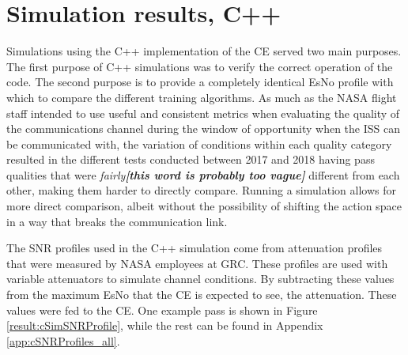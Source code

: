 \section{Simulation results, C++}
\par Simulations using the C++ implementation of the CE served two main purposes. The first purpose of C++ simulations was to verify the correct operation of the code. The second purpose is to provide a completely identical EsNo profile with which to compare the different training algorithms. As much as the NASA flight staff intended to use useful and consistent metrics when evaluating the quality of the communications channel during the window of opportunity when the ISS can be communicated with, the variation of conditions within each quality category resulted in the different tests conducted between 2017 and 2018 having pass qualities that were \textit{fairly\textbf{[this word is probably too vague]}} different from each other, making them harder to directly compare. Running a simulation allows for more direct comparison, albeit without the possibility of shifting the action space in a way that breaks the communication link.
\par The SNR profiles used in the C++ simulation come from attenuation profiles that were measured by NASA employees at GRC. These profiles are used with variable attenuators to simulate channel conditions. By subtracting these values from the maximum EsNo that the CE is expected to see, the attenuation. These values were fed to the CE. One example pass is shown in Figure \ref{result:cSimSNRProfile}, while the rest can be found in Appendix \ref{app:cSNRProfiles_all}. 
